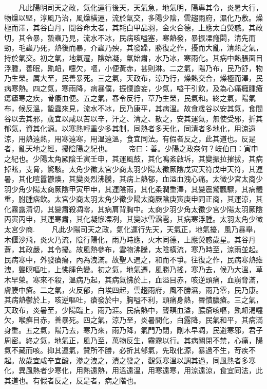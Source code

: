 　　凡此陽明司天之政，氣化運行後天，天氣急，地氣明，陽專其令，炎暑大行，物燥以堅，淳風乃治，風燥橫運，流於氣交，多陽少陰，雲趨雨府，濕化乃敷。燥極而澤，其谷白丹，間谷命太者，其耗白甲品羽，金火合德，上應太白熒惑。其政切，其令暴，蟄蟲乃見，流水不冰，民病咳嗌塞，寒熱發，暴振凓癃閟，清先而勁，毛蟲乃死，熱後而暴，介蟲乃殃，其發躁，勝復之作，擾而大亂，清熱之氣，持於氣交。初之氣，地氣遷，陰始凝，氣始肅，水乃冰，寒雨化。其病中熱脹面目浮腫，善眠，鼽衄，嚏欠，嘔，小便黃赤，甚則淋。二之氣，陽乃布，民乃舒，物乃生榮。厲大至，民善暴死。三之氣，天政布，涼乃行，燥熱交合，燥極而澤，民病寒熱。四之氣，寒雨降，病暴僕，振慄譫妄，少氣，嗌干引飲，及為心痛癰腫瘡瘍瘧寒之疾，骨痿血便。五之氣，春令反行，草乃生榮，民氣和。終之氣，陽氣布，候反溫，蟄蟲來見，流水不冰，民乃康平，其病溫。故食歲谷以安其氣，食間谷以去其邪，歲宜以咸以苦以辛，汗之、清之、散之，安其運氣，無使受邪，折其郁氣，資其化源。以寒熱輕重少多其制，同熱者多天化，同清者多地化，用涼遠涼，用熱遠熱，用寒遠寒，用溫遠溫，食宜同法。有假者反之，此其道也。反是者，亂天地之經，擾陰陽之紀也。
　　帝曰：善。少陽之政奈何？岐伯曰：寅申之紀也。少陽太角厥陰壬寅壬申，其運風鼓，其化鳴紊啟坼，其變振拉摧拔，其病掉眩，支脅，驚駭。太角少徵太宮少商太羽少陽太徵厥陰戊寅天符戊申天符，其運暑，其化暄囂鬱燠，其變炎烈沸騰，其病上熱郁，血溢血洩心痛。太徵少宮太商少羽少角少陽太商厥陰甲寅甲申，其運陰雨，其化柔潤重澤，其變震驚飄驟，其病體重，胕腫痞飲。太宮少商太羽太角少徵少陽太商厥陰庚寅庚申同正商，其運涼，其化霧露清切，其變肅殺凋零，其病肩背胸中。太商少羽少角太徵少宮少陽太羽厥陰丙寅丙申，其運寒肅，其化凝慘凓冽，其變冰雪霜雹，其病寒浮腫。太羽太角少徵太宮少商.
　　凡此少陽司天之政，氣化運行先天，天氣正，地氣擾，風乃暴舉，木偃沙飛，炎火乃流，陰行陽化，雨乃時應，火木同德，上應熒惑歲星。其谷丹蒼，其政嚴，其令擾。故風熱參布，雲物沸騰，太陰橫流，寒乃時至，涼雨並起。民病寒中，外發瘡瘍，內為洩滿。故聖人遇之，和而不爭。往復之作，民病寒熱瘧洩，聾瞑嘔吐，上怫腫色變。初之氣，地氣遷，風勝乃搖，寒乃去，候乃大溫，草木早榮。寒來不殺，溫病乃起，其病氣怫於上，血溢目赤，咳逆頭痛，血崩脅滿，膚腠中瘡。二之氣，火反郁，白埃四起，雲趨雨府，風不勝濕，雨乃零，民乃康。其病熱鬱於上，咳逆嘔吐，瘡發於中，胸嗌不利，頭痛身熱，昬憒膿瘡。三之氣，天政布，炎暑至，少陽臨上，雨乃涯。民病熱中，聾瞑血溢，膿瘡咳嘔，鼽衄渴嚏欠，喉痹目赤，善暴死。四之氣，涼乃至，炎暑間化，白露降，民氣和平，其病滿身重。五之氣，陽乃去，寒乃來，雨乃降，氣門乃閉，剛木早凋，民避寒邪，君子周密。終之氣，地氣正，風乃至，萬物反生，霿霧以行。其病關閉不禁，心痛，陽氣不藏而咳。抑其運氣，贊所不勝，必折其郁氣，先取化源，暴過不生，苛疾不起。故歲宜咸辛宜酸，滲之洩之，漬之發之，觀氣寒溫以調其過，同風熱者多寒化，異風熱者少寒化，用熱遠熱，用溫遠溫，用寒遠寒，用涼遠涼，食宜同法，此其道也。有假者反之，反是者，病之階也。
